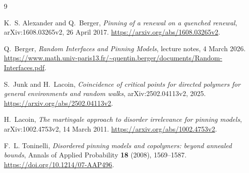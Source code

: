 \documentclass[11pt]{article}
\theoremstyle{remark}
\numberwithin{equation}{section}
\begin{document}
\begin{thebibliography}{9}
\raggedright
{}
K.~S. Alexander and Q.~Berger,
\emph{Pinning of a renewal on a quenched renewal},
arXiv:1608.03265v2, 26 April 2017.
\url{https://arxiv.org/abs/1608.03265v2}.

Q.~Berger,
\emph{Random Interfaces and Pinning Models}, lecture notes, 4 March 2026.
\url{https://www.math.univ-paris13.fr/~quentin.berger/documents/Random-Interfaces.pdf}.

S.~Junk and H.~Lacoin,
\emph{Coincidence of critical points for directed polymers for general
environments and random walks}, arXiv:2502.04113v2, 2025.
\url{https://arxiv.org/abs/2502.04113v2}.

H.~Lacoin,
\emph{The martingale approach to disorder irrelevance for pinning models},
arXiv:1002.4753v2, 14 March 2011.
\url{https://arxiv.org/abs/1002.4753v2}.

F.~L. Toninelli,
\emph{Disordered pinning models and copolymers: beyond annealed bounds},
Annals of Applied Probability \textbf{18} (2008), 1569--1587.
\url{https://doi.org/10.1214/07-AAP496}.
\end{thebibliography}
\end{document}
